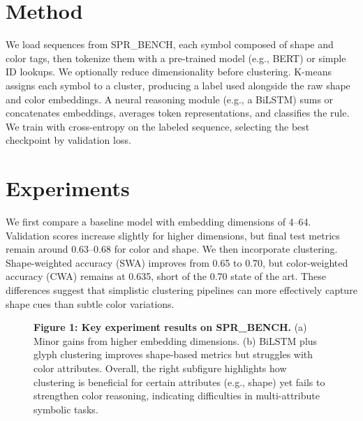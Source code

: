 \documentclass{article} %
\theoremstyle{plain}
\theoremstyle{definition}
\theoremstyle{remark}
\begin{document}
\section{Method}
\label{sec:method}
We load sequences from SPR\_BENCH, each symbol composed of shape and color tags, then tokenize them with a pre-trained model (e.g., BERT) \citep{devlin2019bertpo} or simple ID lookups. We optionally reduce dimensionality \citep{rajotia2025principalca} before clustering. K-means assigns each symbol to a cluster, producing a label used alongside the raw shape and color embeddings. A neural reasoning module (e.g., a BiLSTM) sums or concatenates embeddings, averages token representations, and classifies the rule. We train with cross-entropy on the labeled sequence, selecting the best checkpoint by validation loss.

\section{Experiments}
\label{sec:experiments}
We first compare a baseline model with embedding dimensions of 4--64. Validation scores increase slightly for higher dimensions, but final test metrics remain around 0.63--0.68 for color and shape. We then incorporate clustering. Shape-weighted accuracy (SWA) improves from 0.65 to 0.70, but color-weighted accuracy (CWA) remains at 0.635, short of the 0.70 state of the art. These differences suggest that simplistic clustering pipelines can more effectively capture shape cues than subtle color variations.

\begin{figure}[t!]
\centering
{}
\hfill
{}
\caption{\textbf{Figure 1: Key experiment results on SPR\_BENCH.} (a) Minor gains from higher embedding dimensions. (b) BiLSTM plus glyph clustering improves shape-based metrics but struggles with color attributes. Overall, the right subfigure highlights how clustering is beneficial for certain attributes (e.g., shape) yet fails to strengthen color reasoning, indicating difficulties in multi-attribute symbolic tasks.}
\end{figure}
\end{document}
